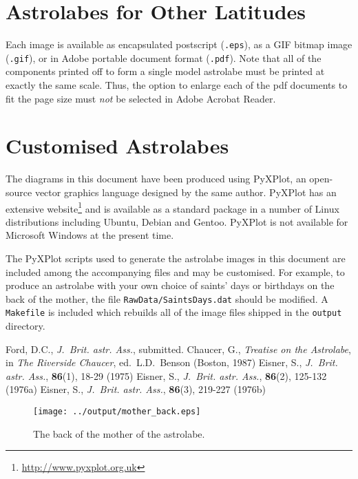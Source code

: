 \documentclass[a4paper,onecolumn,10pt]{article}
\begin{document}
\section*{Astrolabes for Other Latitudes}

Each image is available as encapsulated postscript ({\tt .eps}), as a GIF
bitmap image ({\tt .gif}), or in Adobe portable document format ({\tt .pdf}).
Note that all of the components printed off to form a single model astrolabe
must be printed at exactly the same scale. Thus, the option to enlarge each of
the pdf documents to fit the page size must {\it not} be selected in Adobe
Acrobat Reader.

\section*{Customised Astrolabes}

The diagrams in this document have been produced using PyXPlot, an open-source
vector graphics language designed by the same author. PyXPlot has an extensive
website\footnote{\url{http://www.pyxplot.org.uk}} and is available as a
standard package in a number of Linux distributions including Ubuntu, Debian
and Gentoo. PyXPlot is not available for Microsoft Windows at the present time.

The PyXPlot scripts used to generate the astrolabe images in this document are
included among the accompanying files and may be customised. For example, to
produce an astrolabe with your own choice of saints' days or birthdays on the
back of the mother, the file {\tt RawData/SaintsDays.dat} should be modified. A
{\tt Makefile} is included which rebuilds all of the image files shipped in the
{\tt output} directory.

\begin{thebibliography}{9}
Ford, D.C., \textit{J.\ Brit. astr. Ass.}, submitted.
Chaucer, G., \textit{Treatise on the Astrolabe}, in {\it The Riverside Chaucer}, ed.\ L.D.\ Benson (Boston, 1987)
Eisner, S., \textit{J.\ Brit. astr. Ass.}, \textbf{86}(1), 18-29 (1975)
Eisner, S., \textit{J.\ Brit. astr. Ass.}, \textbf{86}(2), 125-132 (1976a)
Eisner, S., \textit{J.\ Brit. astr. Ass.}, \textbf{86}(3), 219-227 (1976b)
\end{thebibliography}

\newpage

\begin{figure}
\centerline{\texttt{[image: ../output/mother\_back.eps]}}
\caption{The back of the mother of the astrolabe.}
\label{mother_back}
\end{figure}
\end{document}
